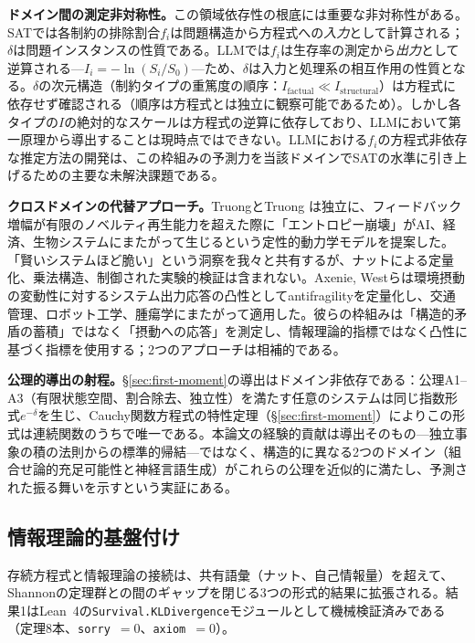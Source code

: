 \documentclass[11pt,a4paper]{article}
\begin{document}
\textbf{ドメイン間の測定非対称性。}この領域依存性の根底には重要な非対称性がある。SATでは各制約の排除割合$f_i$は問題構造から方程式への\emph{入力}として計算される；$\delta$は問題インスタンスの性質である。LLMでは$f_i$は生存率の測定から\emph{出力}として逆算される---$I_i = -\ln(S_i/S_0)$---ため、$\delta$は入力と処理系の相互作用の性質となる。$\delta$の次元構造（制約タイプの重篤度の順序：$I_{\text{factual}} \ll I_{\text{structural}}$）は方程式に依存せず確認される（順序は方程式とは独立に観察可能であるため）。しかし各タイプの$I$の絶対的なスケールは方程式の逆算に依存しており、LLMにおいて第一原理から導出することは現時点ではできない。LLMにおける$f_i$の方程式非依存な推定方法の開発は、この枠組みの予測力を当該ドメインでSATの水準に引き上げるための主要な未解決課題である。

\textbf{クロスドメインの代替アプローチ。}TruongとTruong \cite{truong2025entropy}は独立に、フィードバック増幅が有限のノベルティ再生能力を超えた際に「エントロピー崩壊」がAI、経済、生物システムにまたがって生じるという定性的動力学モデルを提案した。「賢いシステムほど脆い」という洞察を我々と共有するが、ナットによる定量化、乗法構造、制御された実験的検証は含まれない。Axenie, Westら\cite{axenie2024antifragility}は環境摂動の変動性に対するシステム出力応答の凸性としてantifragilityを定量化し、交通管理、ロボット工学、腫瘍学にまたがって適用した。彼らの枠組みは「構造的矛盾の蓄積」ではなく「摂動への応答」を測定し、情報理論的指標ではなく凸性に基づく指標を使用する；2つのアプローチは相補的である。

\textbf{公理的導出の射程。}\S\ref{sec:first-moment}の導出はドメイン非依存である：公理A1--A3（有限状態空間、割合除去、独立性）を満たす任意のシステムは同じ指数形式$e^{-\delta}$を生じ、Cauchy関数方程式の特性定理（\S\ref{sec:first-moment}）によりこの形式は連続関数のうちで唯一である。本論文の経験的貢献は導出そのもの---独立事象の積の法則からの標準的帰結---ではなく、構造的に異なる2つのドメイン（組合せ論的充足可能性と神経言語生成）がこれらの公理を近似的に満たし、予測された振る舞いを示すという実証にある。

\subsection{情報理論的基盤付け}
\label{sec:info-theory-grounding}

存続方程式と情報理論の接続は、共有語彙（ナット、自己情報量）を超えて、Shannonの定理群との間のギャップを閉じる3つの形式的結果に拡張される。結果1はLean~4の\texttt{Survival.KLDivergence}モジュールとして機械検証済みである（定理8本、\texttt{sorry}~$= 0$、\texttt{axiom}~$= 0$）。
\end{document}
